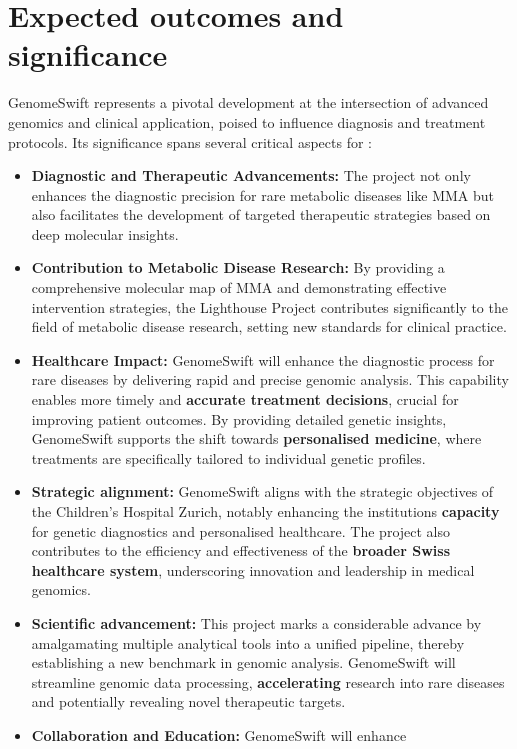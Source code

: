 \section{Expected outcomes and significance}\label{significance}

GenomeSwift represents a pivotal development at the intersection of
advanced genomics and clinical application, poised to influence
diagnosis and treatment protocols. Its significance spans several
critical aspects for \kispi:

\begin{itemize}
\item \textbf{Diagnostic and Therapeutic Advancements:} The project not only enhances the diagnostic precision for rare metabolic diseases like MMA but also facilitates the development of targeted therapeutic strategies based on deep molecular insights.
\item \textbf{Contribution to Metabolic Disease Research:} By providing a comprehensive molecular map of MMA and demonstrating effective intervention strategies, the Lighthouse Project contributes significantly to the field of metabolic disease research, setting new standards for clinical practice.
\item \textbf{Healthcare Impact:} GenomeSwift will enhance the diagnostic
process for rare diseases by delivering rapid and precise genomic
analysis. This capability enables more timely and \textbf{accurate
treatment decisions}, crucial for improving patient outcomes. By
providing detailed genetic insights, GenomeSwift supports the shift
towards \textbf{personalised medicine}, where treatments are
specifically tailored to individual genetic profiles.
\item \textbf{Strategic alignment:} GenomeSwift aligns with the strategic
objectives of the Children's Hospital Zurich, notably enhancing the
institution\textquotesingle s \textbf{capacity} for genetic diagnostics
and personalised healthcare. The project also contributes to the
efficiency and effectiveness of the \textbf{broader Swiss healthcare
system}, underscoring innovation and leadership in medical genomics.
\item \textbf{Scientific advancement:} This project marks a considerable
advance by amalgamating multiple analytical tools into a unified
pipeline, thereby establishing a new benchmark in genomic analysis.
GenomeSwift will streamline genomic data processing,
\textbf{accelerating} research into rare diseases and potentially
revealing novel therapeutic targets.
\item \textbf{Collaboration and Education:} GenomeSwift will enhance

\end{itemize}
